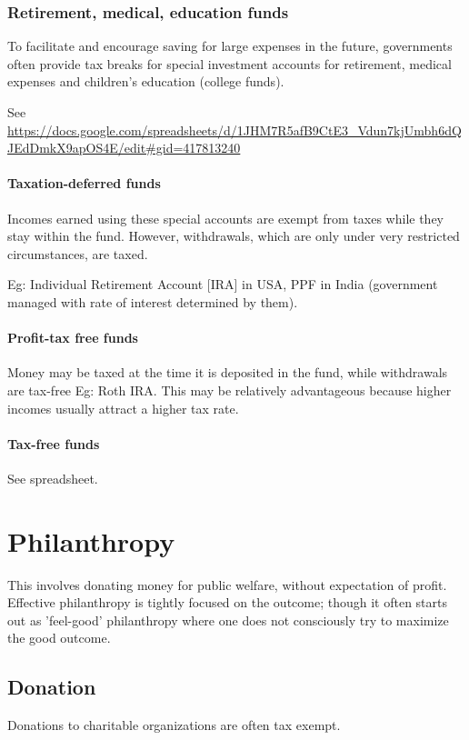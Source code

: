 \documentclass[oneside, article]{memoir}
\begin{document}
\subsection{Retirement, medical, education funds}
To facilitate and encourage saving for large expenses in the future, governments often provide tax breaks for special investment accounts for retirement, medical expenses and children's education (college funds). 

See \url{https://docs.google.com/spreadsheets/d/1JHM7R5afB9CtE3_Vdun7kjUmbh6dQJEdDmkX9apOS4E/edit#gid=417813240} 

\subsubsection{Taxation-deferred funds}
Incomes earned using these special accounts are exempt from taxes while they stay within the fund. However, withdrawals, which are only under very restricted circumstances, are taxed. 

Eg: Individual Retirement Account [IRA] in USA, PPF in India (government managed with rate of interest determined by them). 

\subsubsection{Profit-tax free funds}
Money may be taxed at the time it is deposited in the fund, while withdrawals are tax-free Eg: Roth IRA. This may be relatively advantageous because higher incomes usually attract a higher tax rate.

\subsubsection{Tax-free funds}
See spreadsheet.

\chapter{Philanthropy}
This involves donating money for public welfare, without expectation of profit. Effective philanthropy is tightly focused on the outcome; though it often starts out as 'feel-good' philanthropy where one does not consciously try to maximize the good outcome.

\section{Donation}
Donations to charitable organizations are often tax exempt.
\end{document}
